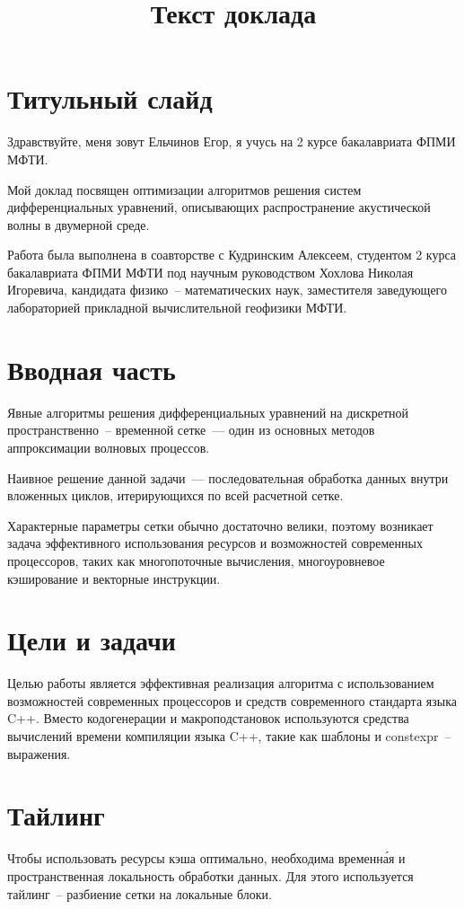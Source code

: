 \documentclass[18pt]{article}
\title{Текст доклада}
\begin{document}
\section{Титульный слайд}
\par
Здравствуйте, меня зовут Ельчинов Егор, я учусь на 2 курсе 
бакалавриата ФПМИ МФТИ.

Мой доклад посвящен оптимизации алгоритмов решения 
систем дифференциальных уравнений, описывающих распространение акустической
волны в двумерной среде.

Работа была выполнена в соавторстве с Кудринским Алексеем, студентом 2 курса
бакалавриата ФПМИ МФТИ под научным руководством Хохлова Николая Игоревича, 
кандидата физико~-- математических наук, заместителя заведующего 
лабораторией прикладной вычислительной геофизики МФТИ.

\section{Вводная часть}
\par
Явные алгоритмы решения дифференциальных уравнений на дискретной 
пространственно~-- временной сетке~--- один из основных методов
аппроксимации волновых процессов.

Наивное решение данной задачи~--- последовательная обработка 
данных внутри вложенных циклов, итерирующихся по всей расчетной сетке.

Характерные параметры сетки обычно достаточно велики, 
поэтому возникает задача эффективного использования 
ресурсов и возможностей современных процессоров, 
таких как многопоточные вычисления, многоуровневое кэширование и 
векторные инструкции.

\section{Цели и задачи}
\par
Целью работы является эффективная реализация алгоритма 
с использованием возможностей современных процессоров и 
средств современного стандарта языка C++.
Вместо кодогенерации и макроподстановок используются средства вычислений
времени компиляции языка C++, такие как шаблоны и constexpr~-- выражения.

\section{Тайлинг}
\par
Чтобы использовать ресурсы кэша оптимально, необходима временн\'{а}я и 
пространственная локальность обработки данных.
Для этого используется тайлинг~-- разбиение сетки на локальные блоки.
\end{document}
